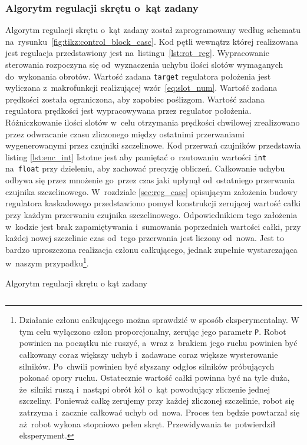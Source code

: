 \documentclass[11pt]{article}
\begin{document}
\subsubsection{Algorytm regulacji skrętu o~kąt zadany}
Algorytm regulacji skrętu o~kąt zadany został zaprogramowany według schematu na~rysunku~\ref{fig:tikz:control_block_casc}.
Kod pętli wewnątrz której realizowana jest regulacja przedstawiony jest na~listingu~\ref{lst:rot_reg}.
Wypracowanie sterowania rozpoczyna się od~wyznaczenia uchybu ilości slotów wymaganych do~wykonania obrotów.
Wartość zadana \texttt{target} regulatora położenia jest wyliczana z~makrofunkcji realizującej wzór~\ref{eq:slot_num}.
Wartość zadana prędkości została ograniczona, aby zapobiec poślizgom.
Wartość zadana regulatora prędkości jest wypracowywana przez regulator położenia.
Różniczkowanie ilości slotów w~celu otrzymania prędkości chwilowej zrealizowano przez odwracanie czasu zliczonego między ostatnimi przerwaniami wygenerowanymi przez czujniki szczelinowe.
Kod przerwań czujników przedstawia listing \ref{lst:enc_int}
Istotne jest aby pamiętać o~rzutowaniu wartości \texttt{int} na~\texttt{float} przy dzieleniu, aby zachować precyzję obliczeń.
Całkowanie uchybu odbywa się przez mnożenie go~przez czas jaki upłynął od~ostatniego przerwania czujnika szczelinowego.
W~rozdziale \ref{sec:reg_casc} opisującym założenia budowy regulatora kaskadowego przedstawiono pomysł konstrukcji zerującej wartość całki przy każdym przerwaniu czujnika szczelinowego.
Odpowiednikiem tego założenia w~kodzie jest brak zapamiętywania i~sumowania poprzednich wartości całki, przy każdej nowej szczelinie czas od~tego przerwania jest liczony od~nowa.
Jest to bardzo uproszczona realizacja członu całkującego, jednak zupełnie wystarczająca w~naszym przypadku\footnote{
	Działanie członu całkującego można sprawdzić w sposób eksperymentalny.
	W tym celu wyłączono człon proporcjonalny, zerując jego parametr \texttt{P}.
	Robot powinien na początku nie ruszyć, a~wraz z~brakiem jego ruchu powinien być całkowany coraz większy uchyb i~zadawane coraz większe wysterowanie silników.
	Po~chwili powinien być słyszany odgłos silników próbujących pokonać opory ruchu.
	Ostatecznie wartość całki powinna być na tyle duża, że~silniki ruszą i~nastąpi obrót kół o~kąt powodujący zliczenie jednej szczeliny.
	Ponieważ całkę zerujemy przy każdej zliczonej szczelinie, robot się zatrzyma i~zacznie całkować uchyb od~nowa.
	Proces ten będzie powtarzał się aż~robot wykona stopniowo pełen skręt.
	Przewidywania te~potwierdził eksperyment.
}.

\begin{listing}[htb]
\caption{Algorytm regulacji skrętu o kąt zadany}
\inputminted[firstline=85, lastline=130, frame=lines, linenos, breaklines, fontsize=\small ]{cpp}{../src/platformMotors.cpp}
\label{lst:rot_reg}
\end{listing}
\end{document}
